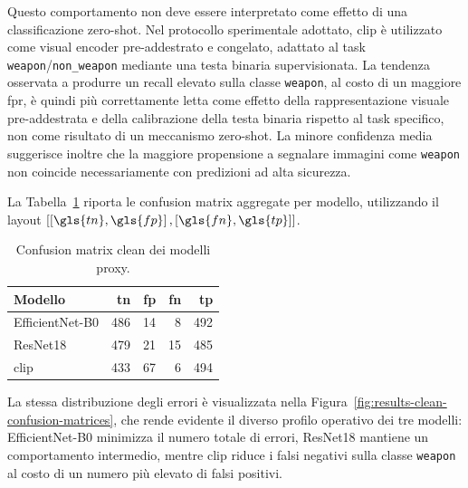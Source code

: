 Questo comportamento non deve essere interpretato come effetto di una
classificazione zero-shot. Nel protocollo sperimentale adottato, \gls{clip} è
utilizzato come visual encoder pre-addestrato e congelato, adattato al task
\texttt{weapon}/\texttt{non\_weapon} mediante una testa binaria supervisionata.
La tendenza osservata a produrre un recall elevato sulla classe \texttt{weapon},
al costo di un maggiore \gls{fpr}, è quindi più correttamente letta come effetto
della rappresentazione visuale pre-addestrata e della calibrazione della testa
binaria rispetto al task specifico, non come risultato di un meccanismo zero-shot.
La minore confidenza media suggerisce inoltre che la maggiore propensione a
segnalare immagini come \texttt{weapon} non coincide necessariamente con predizioni
ad alta sicurezza.

La Tabella~\ref{tab:results-clean-confusion-matrices} riporta le confusion
matrix aggregate per modello, utilizzando il layout
\(\left[\left[\gls{tn}, \gls{fp}\right], \left[\gls{fn}, \gls{tp}\right]\right]\).

\begin{table}[H]
\centering
\caption{Confusion matrix clean dei modelli proxy.}
\label{tab:results-clean-confusion-matrices}
\begin{tabular}{@{}l r r r r@{}}
\toprule
\textbf{Modello} & \textbf{\gls{tn}} & \textbf{\gls{fp}} & \textbf{\gls{fn}} & \textbf{\gls{tp}} \\
\midrule
EfficientNet-B0 & 486 & 14 & 8 & 492 \\
ResNet18 & 479 & 21 & 15 & 485 \\
\gls{clip} & 433 & 67 & 6 & 494 \\
\bottomrule
\end{tabular}
\end{table}

La stessa distribuzione degli errori è visualizzata nella
Figura~\ref{fig:results-clean-confusion-matrices}, che rende evidente il diverso
profilo operativo dei tre modelli: EfficientNet-B0 minimizza il numero totale di
errori, ResNet18 mantiene un comportamento intermedio, mentre \gls{clip} riduce
i falsi negativi sulla classe \texttt{weapon} al costo di un numero più elevato
di falsi positivi.

